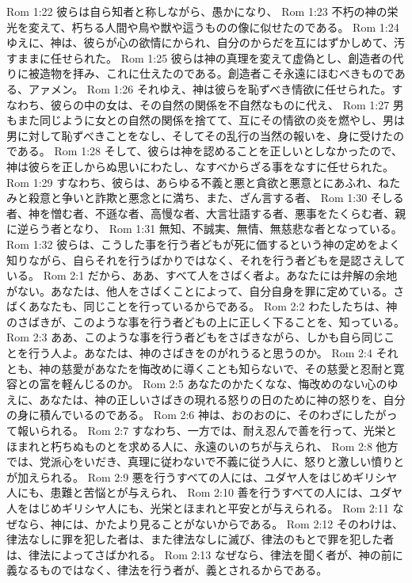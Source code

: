 Rom 1:22  彼らは自ら知者と称しながら、愚かになり、
Rom 1:23  不朽の神の栄光を変えて、朽ちる人間や鳥や獣や這うものの像に似せたのである。
Rom 1:24  ゆえに、神は、彼らが心の欲情にかられ、自分のからだを互にはずかしめて、汚すままに任せられた。
Rom 1:25  彼らは神の真理を変えて虚偽とし、創造者の代りに被造物を拝み、これに仕えたのである。創造者こそ永遠にほむべきものである、アァメン。
Rom 1:26  それゆえ、神は彼らを恥ずべき情欲に任せられた。すなわち、彼らの中の女は、その自然の関係を不自然なものに代え、
Rom 1:27  男もまた同じように女との自然の関係を捨てて、互にその情欲の炎を燃やし、男は男に対して恥ずべきことをなし、そしてその乱行の当然の報いを、身に受けたのである。
Rom 1:28  そして、彼らは神を認めることを正しいとしなかったので、神は彼らを正しからぬ思いにわたし、なすべからざる事をなすに任せられた。
Rom 1:29  すなわち、彼らは、あらゆる不義と悪と貪欲と悪意とにあふれ、ねたみと殺意と争いと詐欺と悪念とに満ち、また、ざん言する者、
Rom 1:30  そしる者、神を憎む者、不遜な者、高慢な者、大言壮語する者、悪事をたくらむ者、親に逆らう者となり、
Rom 1:31  無知、不誠実、無情、無慈悲な者となっている。
Rom 1:32  彼らは、こうした事を行う者どもが死に価するという神の定めをよく知りながら、自らそれを行うばかりではなく、それを行う者どもを是認さえしている。
Rom 2:1  だから、ああ、すべて人をさばく者よ。あなたには弁解の余地がない。あなたは、他人をさばくことによって、自分自身を罪に定めている。さばくあなたも、同じことを行っているからである。
Rom 2:2  わたしたちは、神のさばきが、このような事を行う者どもの上に正しく下ることを、知っている。
Rom 2:3  ああ、このような事を行う者どもをさばきながら、しかも自ら同じことを行う人よ。あなたは、神のさばきをのがれうると思うのか。
Rom 2:4  それとも、神の慈愛があなたを悔改めに導くことも知らないで、その慈愛と忍耐と寛容との富を軽んじるのか。
Rom 2:5  あなたのかたくなな、悔改めのない心のゆえに、あなたは、神の正しいさばきの現れる怒りの日のために神の怒りを、自分の身に積んでいるのである。
Rom 2:6  神は、おのおのに、そのわざにしたがって報いられる。
Rom 2:7  すなわち、一方では、耐え忍んで善を行って、光栄とほまれと朽ちぬものとを求める人に、永遠のいのちが与えられ、
Rom 2:8  他方では、党派心をいだき、真理に従わないで不義に従う人に、怒りと激しい憤りとが加えられる。
Rom 2:9  悪を行うすべての人には、ユダヤ人をはじめギリシヤ人にも、患難と苦悩とが与えられ、
Rom 2:10  善を行うすべての人には、ユダヤ人をはじめギリシヤ人にも、光栄とほまれと平安とが与えられる。
Rom 2:11  なぜなら、神には、かたより見ることがないからである。
Rom 2:12  そのわけは、律法なしに罪を犯した者は、また律法なしに滅び、律法のもとで罪を犯した者は、律法によってさばかれる。
Rom 2:13  なぜなら、律法を聞く者が、神の前に義なるものではなく、律法を行う者が、義とされるからである。
